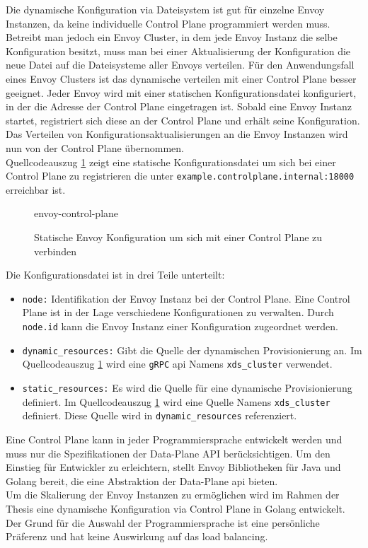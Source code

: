 Die dynamische Konfiguration via Dateisystem ist gut für einzelne Envoy Instanzen, da keine individuelle Control Plane programmiert werden muss. Betreibt man jedoch ein Envoy Cluster, in dem jede Envoy Instanz die selbe Konfiguration besitzt, muss man bei einer Aktualisierung der Konfiguration die neue Datei auf die Dateisysteme aller Envoys verteilen.
Für den Anwendungsfall eines Envoy Clusters ist das dynamische verteilen mit einer Control Plane besser geeignet. Jeder Envoy wird mit einer statischen Konfigurationsdatei konfiguriert, in der die Adresse der Control Plane eingetragen ist. Sobald eine Envoy Instanz startet, registriert sich diese an der Control Plane und erhält seine Konfiguration. Das Verteilen von Konfigurationsaktualisierungen an die Envoy Instanzen wird nun von der Control Plane übernommen.
\\
Quellcodeauszug \ref{code:envoy-control-plane} zeigt eine statische Konfigurationsdatei um sich bei einer Control Plane zu registrieren die unter \verb|example.controlplane.internal:18000| erreichbar ist.
\begin{figure}
    {envoy-control-plane}
    \caption{Statische Envoy Konfiguration um sich mit einer Control Plane zu verbinden}
    \label{code:envoy-control-plane}
\end{figure}
Die Konfigurationsdatei ist in drei Teile unterteilt:
\begin{itemize}
  \item \verb|node:| Identifikation der Envoy Instanz bei der Control Plane. Eine Control Plane ist in der Lage verschiedene Konfigurationen zu verwalten. Durch \verb|node.id| kann die Envoy Instanz einer Konfiguration zugeordnet werden.
  \item \verb|dynamic_resources:| Gibt die Quelle der dynamischen Provisionierung an. Im Quellcodeauszug \ref{code:envoy-control-plane} wird eine \verb|gRPC| \ac{api} Namens \verb|xds_cluster| verwendet.
  \item \verb|static_resources:| Es wird die Quelle für eine dynamische Provisionierung definiert. Im Quellcodeauszug \ref{code:envoy-control-plane} wird eine Quelle Namens \verb|xds_cluster| definiert. Diese Quelle wird in \verb|dynamic_resources| referenziert.
\end{itemize}
Eine Control Plane kann in jeder Programmiersprache entwickelt werden und muss nur die Spezifikationen der Data-Plane API \cite{EnvoyproxyDataplaneapi2021} berücksichtigen. Um den Einstieg für Entwickler zu erleichtern, stellt Envoy Bibliotheken für Java und Golang bereit, die eine Abstraktion der Data-Plane \ac{api} bieten.
\\
Um die Skalierung der Envoy Instanzen zu ermöglichen wird im Rahmen der Thesis eine dynamische Konfiguration via Control Plane in Golang entwickelt. Der Grund für die Auswahl der Programmiersprache ist eine persönliche Präferenz und hat keine Auswirkung auf das load balancing.

